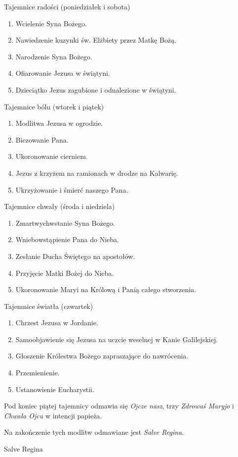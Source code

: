 ﻿\documentclass[9pt,twoside]{extarticle}
\begin{document}
{\hnr Tajemnice radości (poniedziałek i sobota)


\begin{enumerate}
\itemsep0em
\item Wcielenie Syna Bożego.
\item Nawiedzenie kuzynki św. Elżbiety przez Matkę Bożą.
\item Narodzenie Syna Bożego.
\item Ofiarowanie Jezusa w świątyni.
\item Dzieciątko Jezus zagubione i odnalezione w świątyni.
\end{enumerate}


Tajemnice bólu (wtorek i piątek)


\begin{enumerate}
\itemsep0em
\item Modlitwa Jezusa w ogrodzie.
\item Biczowanie Pana.
\item Ukoronowanie cierniem.
\item Jezus z krzyżem na ramionach w drodze na Kalwarię.
\item Ukrzyżowanie i śmierć naszego Pana.
\end{enumerate}


Tajemnice chwały (środa i niedziela)


\begin{enumerate}
\itemsep0em
\item Zmartwychwstanie Syna Bożego.
\item Wniebowstąpienie Pana do Nieba.
\item Zesłanie Ducha Świętego na apostołów.
\item Przyjęcie Matki Bożej do Nieba.
\item Ukoronowanie Maryi na Królową i Panią całego stworzenia.
\end{enumerate}


Tajemnice światła (czwartek)


\begin{enumerate}
\itemsep0em
\item Chrzest Jezusa w Jordanie. 
\item Samoobjawienie się Jezusa na uczcie weselnej w Kanie Galilejskiej. 
\item Głoszenie Królestwa Bożego zapraszające do nawrócenia. 
\item Przemienienie. 
\item Ustanowienie Eucharystii.
\end{enumerate}


Pod koniec piątej tajemnicy odmawia się {\em Ojcze nasz}, trzy {\em Zdrowaś Maryjo} i {\em Chwała Ojcu} w intencji papieża.


Na zakończenie tych modlitw odmawiane jest {\em Salve Regina}.


Salve Regina}
\end{document}
